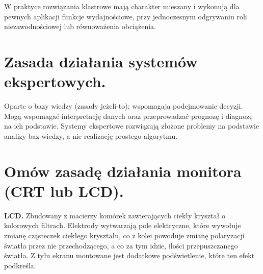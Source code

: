 \documentclass[12pt,a4paper]{article}
\begin{document}
	W praktyce rozwiązania klastrowe mają charakter mieszany i wykonują dla pewnych aplikacji funkcje wydajnościowe, przy jednoczesnym odgrywaniu roli niezawodnościowej lub równoważenia obciążenia.

	\section{Zasada działania systemów ekspertowych.}
	Oparte o bazy wiedzy (zasady jeżeli-to); wspomagają podejmowanie decyzji. Mogą wspomagać interpretację danych oraz przeprowadzać prognozę i diagnozę na ich podstawie.
	Systemy ekspertowe rozwiązują złożone problemy na podstawie analizy baz wiedzy, a nie realizację prostego algorytmu.

	\section{Omów zasadę działania monitora (CRT lub LCD).}
	\label{sec:zasdziallcd}
	\textbf{LCD.} Zbudowany z macierzy komórek zawierających ciekły kryształ o kolorowych filtrach. Elektrody wytwarzają pole elektryczne, które wywołuje zmianę cząsteczek ciekłego kryształu, co z kolei powoduje zmianę polaryzacji światła przez nie przechodzącego, a co za tym idzie, ilości przepuszczanego światła. Z tyłu ekranu montowane jest dodatkowe podświetlenie, które ten efekt podkreśla.
\end{document}
